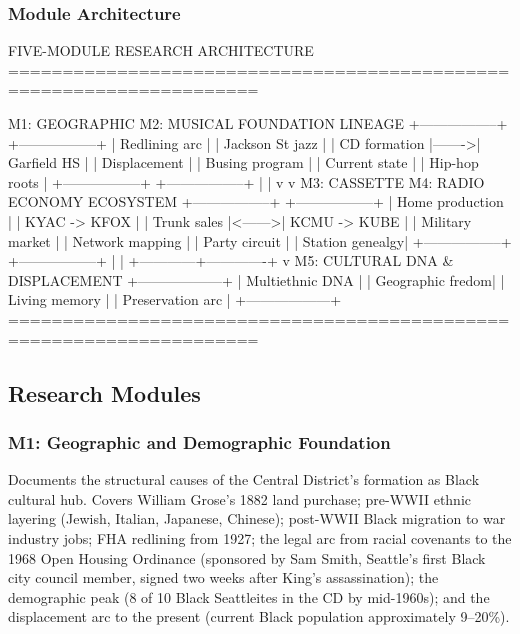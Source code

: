 \documentclass[11pt,letterpaper]{article}
\begin{document}
\subsubsection{Module Architecture}

\begin{asciibox}
FIVE-MODULE RESEARCH ARCHITECTURE
=====================================================================

  M1: GEOGRAPHIC             M2: MUSICAL
  FOUNDATION                 LINEAGE
  +-----------------+        +-----------------+
  | Redlining arc   |        | Jackson St jazz |
  | CD formation    |------->| Garfield HS     |
  | Displacement    |        | Busing program  |
  | Current state   |        | Hip-hop roots   |
  +-----------------+        +-----------------+
           |                          |
           v                          v
  M3: CASSETTE               M4: RADIO
  ECONOMY                    ECOSYSTEM
  +-----------------+        +-----------------+
  | Home production |        | KYAC -> KFOX   |
  | Trunk sales     |<------>| KCMU -> KUBE   |
  | Military market |        | Network mapping |
  | Party circuit   |        | Station genealgy|
  +-----------------+        +-----------------+
           |                          |
           +------------+-------------+
                        v
              M5: CULTURAL DNA
              & DISPLACEMENT
              +------------------+
              | Multiethnic DNA  |
              | Geographic fredom|
              | Living memory    |
              | Preservation arc |
              +------------------+
=====================================================================
\end{asciibox}

\subsection{Research Modules}

\subsubsection{M1: Geographic and Demographic Foundation}

Documents the structural causes of the Central District's formation as Black cultural hub. Covers William Grose's 1882 land purchase; pre-WWII ethnic layering (Jewish, Italian, Japanese, Chinese); post-WWII Black migration to war industry jobs; FHA redlining from 1927; the legal arc from racial covenants to the 1968 Open Housing Ordinance (sponsored by Sam Smith, Seattle's first Black city council member, signed two weeks after King's assassination); the demographic peak (8 of 10 Black Seattleites in the CD by mid-1960s); and the displacement arc to the present (current Black population approximately 9--20\%).
\end{document}
